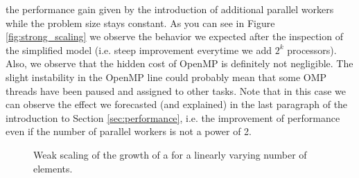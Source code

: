 \documentclass{article}
\begin{document}
the performance gain given by the introduction of additional parallel workers
while the problem size stays constant. As you can see in Figure
\ref{fig:strong_scaling} we observe the behavior we expected after the
inspection of the simplified model (i.e. steep improvement everytime we add
$2^k$ processors). Also, we observe that the hidden cost of OpenMP is definitely
not negligible. The slight instability in the OpenMP line could probably mean
that some OMP threads have been paused and assigned to other tasks. Note that
in this case we can observe the effect we forecasted (and explained)
in the last paragraph of the introduction to Section \ref{sec:performance}, i.e.
the improvement of performance even if the number of parallel workers is not
a power of 2.

\begin{figure}[b!]
    \centering
    \begin{subfigure}[b]{0.4\textwidth}
        \centering
    \end{subfigure}
    \hspace{1cm}
    \begin{subfigure}[b]{0.4\textwidth}
        \centering
    \end{subfigure}
    \caption{Weak scaling of the growth of a \kdtree{} for a linearly varying number of elements.}
    \label{fig:weak_scaling}
\end{figure}
\end{document}
